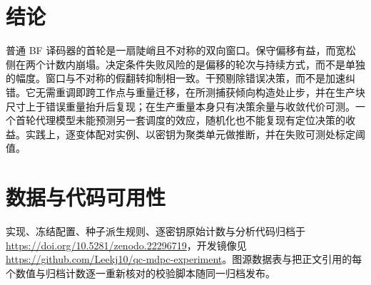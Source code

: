 \documentclass[UTF8,a4paper,10pt,onecolumn]{ctexart}
\begin{document}
\section{结论}\label{sec:conclusion}

普通 BF 译码器的首轮是一扇陡峭且不对称的双向窗口。保守偏移有益，而宽松侧在两个计数内崩塌。决定条件失败风险的是偏移的轮次与持续方式，而不是单独的幅度。窗口与不对称的假翻转抑制相一致。干预剔除错误决策，而不是加速纠错。它无需重调即跨工作点与重量迁移，在所测捕获倾向构造处止步，并在生产块尺寸上于错误重量抬升后复现；在生产重量本身只有决策余量与收敛代价可测。一个首轮代理模型未能预测另一套调度的效应，随机化也不能复现有定位决策的收益。实践上，逐变体配对实例、以密钥为聚类单元做推断，并在失败可测处标定阈值。
\section*{数据与代码可用性}
实现、冻结配置、种子派生规则、逐密钥原始计数与分析代码归档于 \url{https://doi.org/10.5281/zenodo.22296719}，开发镜像见 \url{https://github.com/Leekj10/qc-mdpc-experiment}。图源数据表与把正文引用的每个数值与归档计数逐一重新核对的校验脚本随同一归档发布。



\end{document}
